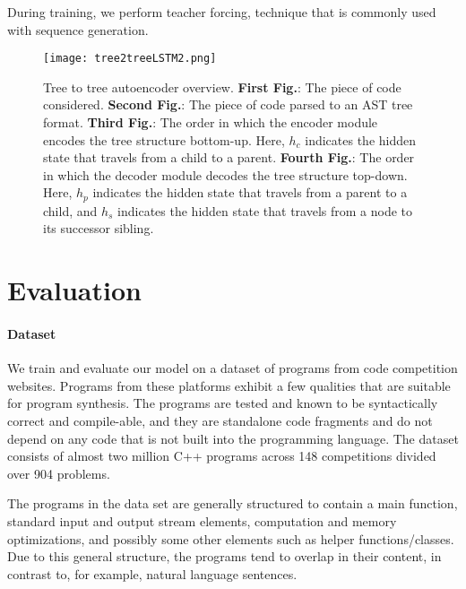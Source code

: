 During training, we perform teacher forcing, technique that is commonly used with sequence generation.

\begin{figure*}[ht!]
    \centering
    \texttt{[image: tree2treeLSTM2.png]}
    \caption[Tree2Tree model high-level overview]{Tree to tree autoencoder overview. \textbf{First Fig.}: The piece of code considered. \textbf{Second Fig.}: The piece of code parsed to an AST tree format. \textbf{Third Fig.}: The order in which the encoder module encodes the tree structure bottom-up. Here, $h_c$ indicates the hidden state that travels from a child to a parent. \textbf{Fourth Fig.}: The order in which the decoder module decodes the tree structure top-down. Here, $h_p$ indicates the hidden state that travels from a parent to a child, and $h_s$ indicates the hidden state that travels from a node to its successor sibling.}
    \label{fig:tree2treeVAE}
\end{figure*}

\newpage
\section{Evaluation}
\label{evaluation}

\paragraph{Dataset}
We train and evaluate our model on a dataset of programs from code competition websites. Programs from these platforms exhibit a few qualities that are suitable for program synthesis. The programs are tested and known to be syntactically correct and compile-able, and they are standalone code fragments and do not depend on any code that is not built into the programming language. The dataset consists of almost two million C++ programs across 148 competitions divided over 904 problems. 

The programs in the data set are generally structured to contain a main function, standard input and output stream elements, computation and memory optimizations, and possibly some other elements such as helper functions/classes. Due to this general structure, the programs tend to overlap in their content, in contrast to, for example, natural language sentences. 

